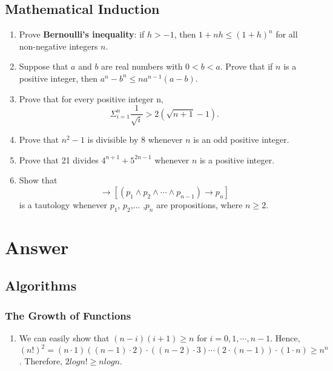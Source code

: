 \documentclass{../../cls/sig-alternate-05-2015}
\begin{document}
\subsection{Mathematical Induction}
\begin{enumerate}
\item Prove \textbf{Bernoulli’s inequality}: if $h > -1$, then $1+nh \le (1+h)^n$ for all non-negative integers $n$.

\item Suppose that $a$ and $b$ are real numbers with $0 < b < a$.
Prove that if $n$ is a positive integer, then $a^n - b^n \le na^{n - 1}(a - b)$.

\item Prove that for every positive integer n, \begin{equation}
	\Sigma_{i = 1}^n \frac{1}{\sqrt{i}} > 2(\sqrt{n + 1} - 1).
\end{equation}

\item Prove that $n^2 - 1$ is divisible by 8 whenever $n$ is an odd positive integer.

\item Prove that 21 divides $4^{n + 1} + 5^{2n - 1}$ whenever $n$ is a positive integer.

\item Show that \begin{equation}
	[(p_1 \rightarrow p_2) \wedge (p_2 \rightarrow p_3) \wedge \cdots \wedge (p_{n - 1} \rightarrow p_n)] \rightarrow [(p_1 \wedge p_2 \wedge \cdots \wedge p_{n - 1}) \rightarrow p_n]
\end{equation}
is a tautology whenever $p_1$, $p_2$,... ,$p_n$ are propositions, where $n \ge 2$.
\end{enumerate}

\nocite{*}

 
\clearpage
\appendix
\section{Answer}
\subsection{Algorithms}
\subsubsection{The Growth of Functions}
\begin{enumerate}
\item We
can easily show that $(n - i)(i + 1) \ge n$ for $i = 0, 1, \cdots, n - 1$.
Hence, $(n!)^2 = (n \cdot 1)((n - 1) \cdot 2) \cdot ((n - 2) \cdot 3) \cdots (2 \cdot (n -
1)) \cdot (1 \cdot n) \ge n^n$. Therefore, $2 log n! \ge n log n$.
\end{enumerate}
\end{document}
